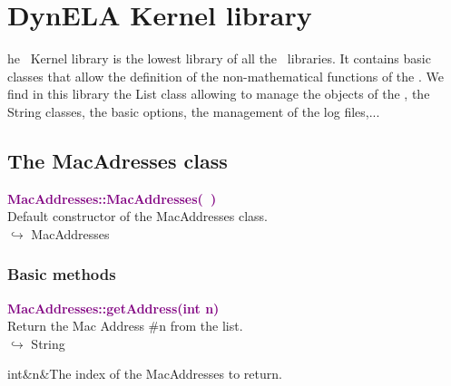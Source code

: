%
%
%
\chapter{DynELA Kernel library}

\startcontents[chapters]
\printmyminitoc[2]he \DynELA~Kernel library is the lowest library of all the \DynELA~libraries. It contains basic classes that allow the definition of the non-mathematical functions of the \DynELA. We find in this library the List class allowing to manage the objects of the \DynELA, the String classes, the basic options, the management of the log files,...

\section{The MacAdresses class}



\textcolor{purple}{\textbf{MacAddresses::MacAddresses(~)}}\label{MacAddresses::MacAddresses()}\\
Default constructor of the MacAddresses class.\\ \hspace*{10mm}$\hookrightarrow$ MacAddresses


\subsection{Basic methods}

\textcolor{purple}{\textbf{MacAddresses::getAddress(int n)}}\label{MacAddresses::getAddress(int n)}\\
Return the Mac Address \#n from the list.\\ \hspace*{10mm}$\hookrightarrow$ String

\begin{tcolorbox}[width=\textwidth,myArgs,tabularx={ll|R}]
int&n&The index of the MacAddresses to return.
\end{tcolorbox}

